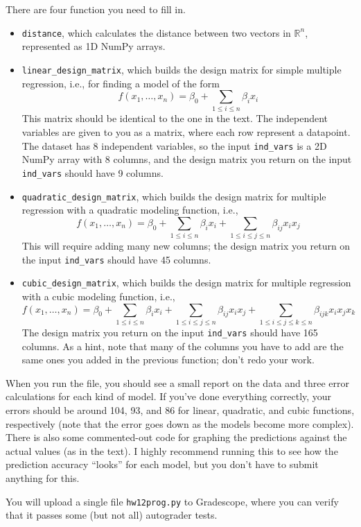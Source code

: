 \documentclass{article}
\theoremstyle{remark}
\newcommand{\R}{\mathbb R}
\begin{document}
There are four function you need to fill in.
\begin{itemize}
\item \texttt{distance}, which calculates the distance between two vectors in $\R^n$, represented as 1D NumPy arrays.
\item \texttt{linear\_design\_matrix}, which builds the design matrix for simple multiple regression, i.e., for finding a model of the form
  \begin{displaymath}
    f(x_1, \dots, x_n) = \beta_0 + \sum_{1 \leq i \leq n} \beta_i x_i
  \end{displaymath}
  This matrix should be identical to the one in the text.
  The independent variables are given to you as a matrix, where each row represent a datapoint.
  The dataset has 8 independent variables, so the input \texttt{ind\_vars} is a 2D NumPy array with 8 columns, and the design matrix you return on the input \texttt{ind\_vars} should have 9 columns.
\item \texttt{quadratic\_design\_matrix}, which builds the design matrix for multiple regression with a quadratic modeling function, i.e.,
  \begin{displaymath}
    f(x_1, \dots, x_n) = \beta_0 + \sum_{1 \leq i \leq n} \beta_i x_i+ \sum_{1 \leq i \leq j \leq n} \beta_{ij} x_ix_j
  \end{displaymath}
  This will require adding many new columns; the design matrix you return on the input \texttt{ind\_vars} should have 45 columns.
\item \texttt{cubic\_design\_matrix}, which builds the design matrix for multiple regression with a cubic modeling function, i.e.,
  \begin{displaymath}
    f(x_1, \dots, x_n) = \beta_0 + \sum_{1 \leq i \leq n} \beta_i x_i + \sum_{1 \leq i \leq j \leq n} \beta_{ij} x_ix_j + \sum_{1 \leq i \leq j \leq k \leq n} \beta_{ijk} x_ix_jx_k
  \end{displaymath}
  The design matrix you return on the input \texttt{ind\_vars} should have 165 columns.
  As a hint, note that many of the columns you have to add are the same ones you added in the previous function; don't redo your work.
\end{itemize}
When you run the file, you should see a small report on the data and three error calculations for each kind of model.
If you've done everything correctly, your errors should be around 104, 93, and 86 for linear, quadratic, and cubic functions, respectively (note that the error goes down as the models become more complex).
There is also some commented-out code for graphing the predictions against the actual values (as in the text).
I highly recommend running this to see how the prediction accuracy ``looks'' for each model, but you don't have to submit anything for this.

You will upload a single file \texttt{hw12prog.py} to Gradescope, where you can verify that it passes some (but not all) autograder tests.
\end{document}
